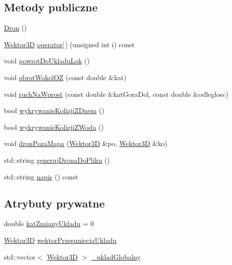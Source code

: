 \subsection*{Metody publiczne}
\begin{DoxyCompactItemize}
\item 
\mbox{\hyperlink{class_dron_ae9b8a464e28bef5d688f49f7d9443fed}{Dron}} ()
\item 
\mbox{\hyperlink{class_wektor3_d}{Wektor3D}} \mbox{\hyperlink{class_dron_a4c0f96b6a0f2102c86088b3787cf6367}{operator\mbox{[}$\,$\mbox{]}}} (unsigned int i) const
\item 
void \mbox{\hyperlink{class_dron_af467b86d475587e9f389597c7fc4590d}{powrot\+Do\+Ukladu\+Lok}} ()
\item 
void \mbox{\hyperlink{class_dron_adae3a230e5bad718740d216e14d6444f}{obrot\+Wokol\+OZ}} (const double \&kat)
\item 
void \mbox{\hyperlink{class_dron_a63285f1fc20adaf5808550654b815ae5}{ruch\+Na\+Wprost}} (const double \&kat\+Gora\+Dol, const double \&odleglosc)
\item 
bool \mbox{\hyperlink{class_dron_a50dfaf809be907460d95b7bccb4897a2}{wykrywanie\+Kolizji\+Z\+Dnem}} ()
\item 
bool \mbox{\hyperlink{class_dron_a580bc95d42e4ef68b5e97e2ec1dfd629}{wykrywanie\+Kolizji\+Z\+Woda}} ()
\item 
void \mbox{\hyperlink{class_dron_a0ae898c60e73e6f2a7c75322f243c1d5}{dron\+Poza\+Mapa}} (\mbox{\hyperlink{class_wektor3_d}{Wektor3D}} \&po, \mbox{\hyperlink{class_wektor3_d}{Wektor3D}} \&ko)
\item 
std\+::string \mbox{\hyperlink{class_dron_a9f0e086f054e87d53aff19dc29dca65a}{generuj\+Drona\+Do\+Pliku}} ()
\item 
std\+::string \mbox{\hyperlink{class_dron_a4d0c2f94599951728a48f848942ed41a}{napis}} () const
\end{DoxyCompactItemize}
\subsection*{Atrybuty prywatne}
\begin{DoxyCompactItemize}
\item 
double \mbox{\hyperlink{class_dron_a5308a71851015cd081e5628675a568d0}{kat\+Zmiany\+Ukladu}} = 0
\item 
\mbox{\hyperlink{class_wektor3_d}{Wektor3D}} \mbox{\hyperlink{class_dron_a02d702b9fcef2ea34dbf0484c1603be5}{wektor\+Przesuniecia\+Ukladu}}
\item 
std\+::vector$<$ \mbox{\hyperlink{class_wektor3_d}{Wektor3D}} $>$ \mbox{\hyperlink{class_dron_a43e00887e49cb783f24175d3529ebfaf}{\+\_\+uklad\+Globalny}}
\end{DoxyCompactItemize}
